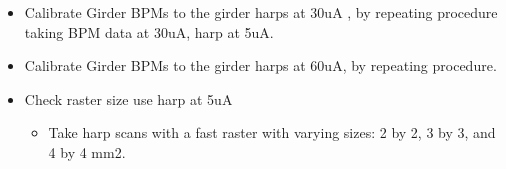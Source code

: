 \documentclass[]{article}
\begin{document}
\begin{itemize}
\begin{itemize}
					\end{itemize}
		\item
		Calibrate Girder BPMs to the girder harps at 30uA , by repeating procedure taking BPM data at 30uA, harp at 5uA.
		
		\item
		Calibrate Girder BPMs to the girder harps at 60uA, by repeating procedure.

		\item
		Check raster size use harp at 5uA
		
		\begin{itemize}
			\item
			Take harp scans with a fast raster with varying sizes: 2 by 2, 3
			by 3, and 4 by 4 mm2.
		\end{itemize}
	\end{itemize}
\end{document}
